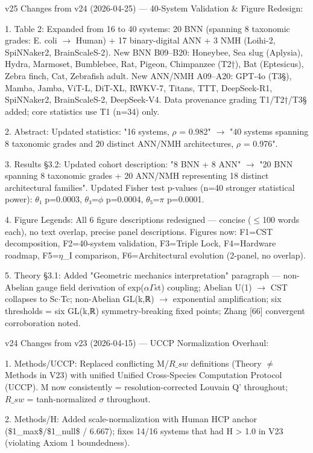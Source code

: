 \documentclass[a4paper,12pt]{article}
\begin{document}
v25 Changes from v24 (2026-04-25) --- 40-System Validation \& Figure Redesign:

1. Table 2: Expanded from 16 to 40 systems: 20 BNN (spanning 8 taxonomic grades: E. coli $\rightarrow$ Human) + 17 binary-digital ANN + 3 NMH (Loihi-2, SpiNNaker2, BrainScaleS-2). New BNN B09--B20: Honeybee, Sea slug (Aplysia), Hydra, Marmoset, Bumblebee, Rat, Pigeon, Chimpanzee (T2†), Bat (Eptesicus), Zebra finch, Cat, Zebrafish adult. New ANN/NMH A09--A20: GPT-4o (T3§), Mamba, Jamba, ViT-L, DiT-XL, RWKV-7, Titans, TTT, DeepSeek-R1, SpiNNaker2, BrainScaleS-2, DeepSeek-V4. Data provenance grading T1/T2†/T3§ added; core statistics use T1 (n=34) only.

2. Abstract: Updated statistics: "16 systems, $\rho$ = 0.982" $\rightarrow$ "40 systems spanning 8 taxonomic grades and 20 distinct ANN/NMH architectures, $\rho$ = 0.976".

3. Results §3.2: Updated cohort description: "8 BNN + 8 ANN" $\rightarrow$ "20 BNN spanning 8 taxonomic grades + 20 ANN/NMH representing 18 distinct architectural families". Updated Fisher test p-values (n=40 stronger statistical power): $\theta$₁ p=0.0003, $\theta$₃=$\phi$ p=0.0004, $\theta$₅=$\pi$ p=0.0001.

4. Figure Legends: All 6 figure descriptions redesigned --- concise ($\leq$100 words each), no text overlap, precise panel descriptions. Figures now: F1=CST decomposition, F2=40-system validation, F3=Triple Lock, F4=Hardware roadmap, F5=$\eta$_I comparison, F6=Architectural evolution (2-panel, no overlap).

5. Theory §3.1: Added "Geometric mechanics interpretation" paragraph --- non-Abelian gauge field derivation of exp($\alpha$\cdot$\Gamma$st) coupling; Abelian U(1) $\rightarrow$ CST collapses to Sc$\cdot$Tc; non-Abelian GL(k,ℝ) $\rightarrow$ exponential amplification; six thresholds = six GL(k,ℝ) symmetry-breaking fixed points; Zhang [66] convergent corroboration noted.

v24 Changes from v23 (2026-04-15) --- UCCP Normalization Overhaul:

1. Methods/UCCP: Replaced conflicting M/$R\_{sw}$ definitions (Theory $\neq$ Methods in V23) with unified Unified Cross-Species Computation Protocol (UCCP). M now consistently = resolution-corrected Louvain Q' throughout; $R\_{sw}$ = tanh-normalized $\sigma$ throughout.

2. Methods/H: Added scale-normalization with Human HCP anchor (\$1_{max}\$/\$1_{null}\$ / 6.667); fixes 14/16 systems that had H > 1.0 in V23 (violating Axiom 1 boundedness).
\end{document}
